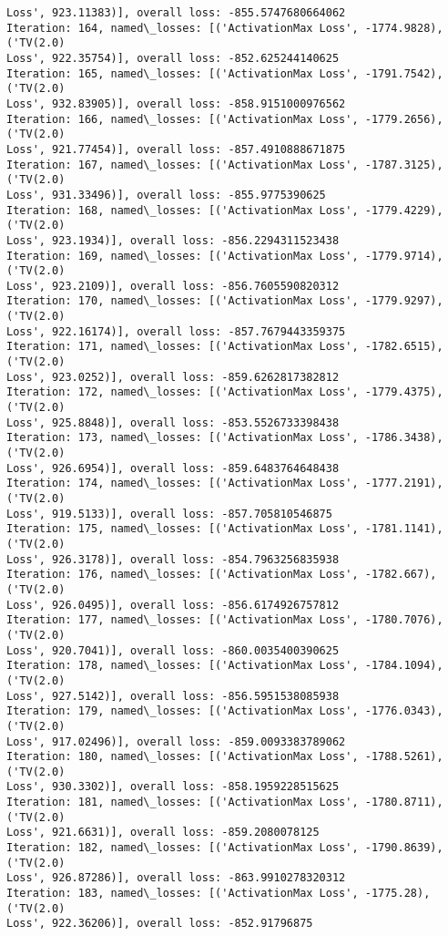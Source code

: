 \documentclass[10pt]{article}
\begin{document}
\begin{Verbatim}[commandchars=\\\{\}]
Loss', 923.11383)], overall loss: -855.5747680664062
Iteration: 164, named\_losses: [('ActivationMax Loss', -1774.9828), ('TV(2.0)
Loss', 922.35754)], overall loss: -852.625244140625
Iteration: 165, named\_losses: [('ActivationMax Loss', -1791.7542), ('TV(2.0)
Loss', 932.83905)], overall loss: -858.9151000976562
Iteration: 166, named\_losses: [('ActivationMax Loss', -1779.2656), ('TV(2.0)
Loss', 921.77454)], overall loss: -857.4910888671875
Iteration: 167, named\_losses: [('ActivationMax Loss', -1787.3125), ('TV(2.0)
Loss', 931.33496)], overall loss: -855.9775390625
Iteration: 168, named\_losses: [('ActivationMax Loss', -1779.4229), ('TV(2.0)
Loss', 923.1934)], overall loss: -856.2294311523438
Iteration: 169, named\_losses: [('ActivationMax Loss', -1779.9714), ('TV(2.0)
Loss', 923.2109)], overall loss: -856.7605590820312
Iteration: 170, named\_losses: [('ActivationMax Loss', -1779.9297), ('TV(2.0)
Loss', 922.16174)], overall loss: -857.7679443359375
Iteration: 171, named\_losses: [('ActivationMax Loss', -1782.6515), ('TV(2.0)
Loss', 923.0252)], overall loss: -859.6262817382812
Iteration: 172, named\_losses: [('ActivationMax Loss', -1779.4375), ('TV(2.0)
Loss', 925.8848)], overall loss: -853.5526733398438
Iteration: 173, named\_losses: [('ActivationMax Loss', -1786.3438), ('TV(2.0)
Loss', 926.6954)], overall loss: -859.6483764648438
Iteration: 174, named\_losses: [('ActivationMax Loss', -1777.2191), ('TV(2.0)
Loss', 919.5133)], overall loss: -857.705810546875
Iteration: 175, named\_losses: [('ActivationMax Loss', -1781.1141), ('TV(2.0)
Loss', 926.3178)], overall loss: -854.7963256835938
Iteration: 176, named\_losses: [('ActivationMax Loss', -1782.667), ('TV(2.0)
Loss', 926.0495)], overall loss: -856.6174926757812
Iteration: 177, named\_losses: [('ActivationMax Loss', -1780.7076), ('TV(2.0)
Loss', 920.7041)], overall loss: -860.0035400390625
Iteration: 178, named\_losses: [('ActivationMax Loss', -1784.1094), ('TV(2.0)
Loss', 927.5142)], overall loss: -856.5951538085938
Iteration: 179, named\_losses: [('ActivationMax Loss', -1776.0343), ('TV(2.0)
Loss', 917.02496)], overall loss: -859.0093383789062
Iteration: 180, named\_losses: [('ActivationMax Loss', -1788.5261), ('TV(2.0)
Loss', 930.3302)], overall loss: -858.1959228515625
Iteration: 181, named\_losses: [('ActivationMax Loss', -1780.8711), ('TV(2.0)
Loss', 921.6631)], overall loss: -859.2080078125
Iteration: 182, named\_losses: [('ActivationMax Loss', -1790.8639), ('TV(2.0)
Loss', 926.87286)], overall loss: -863.9910278320312
Iteration: 183, named\_losses: [('ActivationMax Loss', -1775.28), ('TV(2.0)
Loss', 922.36206)], overall loss: -852.91796875

\end{Verbatim}
\end{document}
